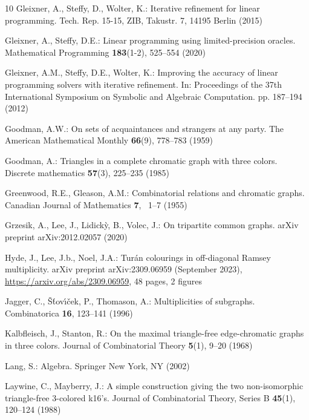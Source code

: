 \documentclass[a4paper,11pt]{article}
\numberwithin{equation}{section}
\begin{document}
\begin{thebibliography}{10}
Gleixner, A., Steffy, D., Wolter, K.: Iterative refinement for linear
  programming. Tech. Rep. 15-15, ZIB, Takustr. 7, 14195 Berlin (2015)

Gleixner, A., Steffy, D.E.: Linear programming using limited-precision oracles.
  Mathematical Programming  \textbf{183}(1-2),  525--554 (2020)

Gleixner, A.M., Steffy, D.E., Wolter, K.: Improving the accuracy of linear
  programming solvers with iterative refinement. In: Proceedings of the 37th
  International Symposium on Symbolic and Algebraic Computation. pp. 187--194
  (2012)

Goodman, A.W.: On sets of acquaintances and strangers at any party. The
  American Mathematical Monthly  \textbf{66}(9),  778--783 (1959)

Goodman, A.: Triangles in a complete chromatic graph with three colors.
  Discrete mathematics  \textbf{57}(3),  225--235 (1985)

Greenwood, R.E., Gleason, A.M.: Combinatorial relations and chromatic graphs.
  Canadian Journal of Mathematics  \textbf{7}, ~1--7 (1955)

Grzesik, A., Lee, J., Lidick{\`y}, B., Volec, J.: On tripartite common graphs.
  arXiv preprint arXiv:2012.02057  (2020)

Hyde, J., Lee, J.b., Noel, J.A.: {T}ur{\'a}n colourings in off-diagonal
  {R}amsey multiplicity. arXiv preprint arXiv:2309.06959  (September 2023),
  \url{https://arxiv.org/abs/2309.06959}, 48 pages, 2 figures

Jagger, C., {\v{S}}{\'t}ov{\'\i}{\v{c}}ek, P., Thomason, A.: Multiplicities of
  subgraphs. Combinatorica  \textbf{16},  123--141 (1996)

Kalbfleisch, J., Stanton, R.: On the maximal triangle-free edge-chromatic
  graphs in three colors. Journal of Combinatorial Theory  \textbf{5}(1),
  9--20 (1968)

Lang, S.: Algebra. Springer New York, NY (2002)

Laywine, C., Mayberry, J.: A simple construction giving the two non-isomorphic
  triangle-free 3-colored k16's. Journal of Combinatorial Theory, Series B
  \textbf{45}(1),  120--124 (1988)


\end{thebibliography}
\end{document}
